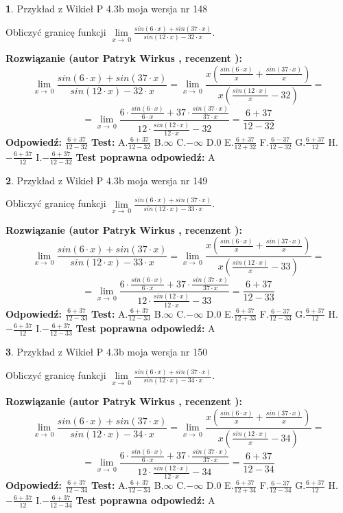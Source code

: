 \documentclass[12pt, a4paper]{article}
\theoremstyle{definition} %
\newtheorem{zad}{}
\newcommand{\zadStart}[1]{\begin{zad}#1\newline}
\newcommand{\zadStop}{\end{zad}}
\newcommand{\rozwStart}[2]{\noindent \textbf{Rozwiązanie (autor #1 , recenzent #2): }\newline}
\newcommand{\rozwStop}{\newline}
\newcommand{\odpStart}{\noindent \textbf{Odpowiedź:}\newline}
\newcommand{\odpStop}{\newline}
\newcommand{\testStart}{\noindent \textbf{Test:}\newline}
\newcommand{\testStop}{\newline}
\newcommand{\kluczStart}{\noindent \textbf{Test poprawna odpowiedź:}\newline}
\newcommand{\kluczStop}{\newline}
\begin{document}
\zadStart{Przykład z Wikieł P 4.3b moja wersja nr 148}


Obliczyć granicę funkcji $\lim\limits_{x\to\ 0}\frac{sin(6 \cdot x)+sin(37 \cdot x)}{sin(12 \cdot x)-32 \cdot x}$.
\zadStop
\rozwStart{Patryk Wirkus}{}
$$\lim\limits_{x\to\ 0}\frac{sin(6 \cdot x)+sin(37 \cdot x)}{sin(12 \cdot x)-32 \cdot x}=\lim\limits_{x\to\ 0}\frac{x(\frac{sin(6 \cdot x)}{x}+\frac{sin(37 \cdot x)}{x})}{x(\frac{sin(12 \cdot x)}{x}-32)}=$$
$$=\lim\limits_{x\to\ 0}\frac{6 \cdot \frac{sin(6 \cdot x)}{6 \cdot x}+37 \cdot \frac{sin(37 \cdot x)}{37 \cdot x}}{12 \cdot \frac{sin(12 \cdot x)}{12 \cdot x}-32}=\frac{6+37}{12-32}$$
\rozwStop
\odpStart
$\frac{6+37}{12-32}$
\odpStop
\testStart
A.$\frac{6+37}{12-32}$
B.$\infty$
C.$-\infty$
D.$0$
E.$\frac{6+37}{12+32}$
F.$\frac{6-37}{12-32}$
G.$\frac{6+37}{12}$
H.$-\frac{6+37}{12}$
I.$-\frac{6+37}{12-32}$
\testStop
\kluczStart
A
\kluczStop



\zadStart{Przykład z Wikieł P 4.3b moja wersja nr 149}


Obliczyć granicę funkcji $\lim\limits_{x\to\ 0}\frac{sin(6 \cdot x)+sin(37 \cdot x)}{sin(12 \cdot x)-33 \cdot x}$.
\zadStop
\rozwStart{Patryk Wirkus}{}
$$\lim\limits_{x\to\ 0}\frac{sin(6 \cdot x)+sin(37 \cdot x)}{sin(12 \cdot x)-33 \cdot x}=\lim\limits_{x\to\ 0}\frac{x(\frac{sin(6 \cdot x)}{x}+\frac{sin(37 \cdot x)}{x})}{x(\frac{sin(12 \cdot x)}{x}-33)}=$$
$$=\lim\limits_{x\to\ 0}\frac{6 \cdot \frac{sin(6 \cdot x)}{6 \cdot x}+37 \cdot \frac{sin(37 \cdot x)}{37 \cdot x}}{12 \cdot \frac{sin(12 \cdot x)}{12 \cdot x}-33}=\frac{6+37}{12-33}$$
\rozwStop
\odpStart
$\frac{6+37}{12-33}$
\odpStop
\testStart
A.$\frac{6+37}{12-33}$
B.$\infty$
C.$-\infty$
D.$0$
E.$\frac{6+37}{12+33}$
F.$\frac{6-37}{12-33}$
G.$\frac{6+37}{12}$
H.$-\frac{6+37}{12}$
I.$-\frac{6+37}{12-33}$
\testStop
\kluczStart
A
\kluczStop



\zadStart{Przykład z Wikieł P 4.3b moja wersja nr 150}


Obliczyć granicę funkcji $\lim\limits_{x\to\ 0}\frac{sin(6 \cdot x)+sin(37 \cdot x)}{sin(12 \cdot x)-34 \cdot x}$.
\zadStop
\rozwStart{Patryk Wirkus}{}
$$\lim\limits_{x\to\ 0}\frac{sin(6 \cdot x)+sin(37 \cdot x)}{sin(12 \cdot x)-34 \cdot x}=\lim\limits_{x\to\ 0}\frac{x(\frac{sin(6 \cdot x)}{x}+\frac{sin(37 \cdot x)}{x})}{x(\frac{sin(12 \cdot x)}{x}-34)}=$$
$$=\lim\limits_{x\to\ 0}\frac{6 \cdot \frac{sin(6 \cdot x)}{6 \cdot x}+37 \cdot \frac{sin(37 \cdot x)}{37 \cdot x}}{12 \cdot \frac{sin(12 \cdot x)}{12 \cdot x}-34}=\frac{6+37}{12-34}$$
\rozwStop
\odpStart
$\frac{6+37}{12-34}$
\odpStop
\testStart
A.$\frac{6+37}{12-34}$
B.$\infty$
C.$-\infty$
D.$0$
E.$\frac{6+37}{12+34}$
F.$\frac{6-37}{12-34}$
G.$\frac{6+37}{12}$
H.$-\frac{6+37}{12}$
I.$-\frac{6+37}{12-34}$
\testStop
\kluczStart
A
\kluczStop
\end{document}
